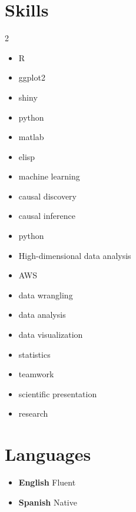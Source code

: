 \documentclass{moderncv}
\begin{document}

\section{Skills}
\label{sec:org425480f}
\begin{multicols}{2}
\begin{itemize}
\item R
\item ggplot2
\item shiny
\item python
\item matlab
\item elisp
\item machine learning
\item causal discovery
\item causal inference
\item python
\item High-dimensional data analysis
\item AWS
\item data wrangling
\item data analysis
\item data visualization
\item statistics
\item teamwork
\item scientific presentation
\item research
\end{itemize}
\end{multicols}


\section{Languages}
\label{sec:orgb0b83bf}
\begin{itemize}
\item \textbf{English} Fluent
\item \textbf{Spanish} Native
\end{itemize}


\begin{refsection}
\nocite{*}

\printbibliography[title={Selected Publications}]
\end{refsection}
\end{document}
